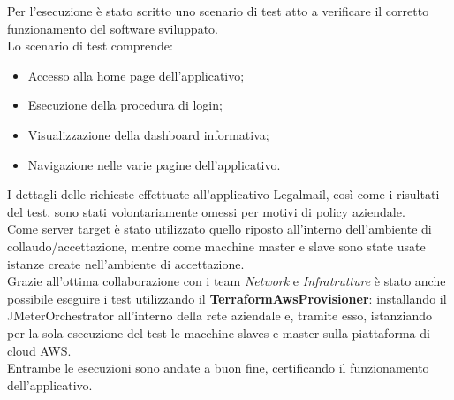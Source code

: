 Per l'esecuzione è stato scritto uno scenario di test atto a verificare il corretto funzionamento del software sviluppato. \\
Lo scenario di test comprende:
\begin{itemize}
	\item Accesso alla home page dell'applicativo;
	\item Esecuzione della procedura di login;
	\item Visualizzazione della dashboard informativa;
	\item Navigazione nelle varie pagine dell'applicativo.
\end{itemize}
I dettagli delle richieste effettuate all'applicativo Legalmail, così come i risultati del test, sono stati volontariamente omessi per motivi di policy aziendale.\\
Come server target è stato utilizzato quello riposto all'interno dell'ambiente di collaudo/accettazione, mentre come macchine master e slave sono state usate istanze create nell'ambiente di accettazione. \\
Grazie all'ottima collaborazione con i team \textit{Network} e \textit{Infratrutture} è stato anche possibile eseguire i test utilizzando il \textbf{TerraformAwsProvisioner}: installando il JMeterOrchestrator all'interno della rete aziendale e, tramite esso, istanziando per la sola esecuzione del test le macchine slaves e master sulla piattaforma di \gls{cloud} AWS. \\
Entrambe le esecuzioni sono andate a buon fine, certificando il funzionamento dell'applicativo.